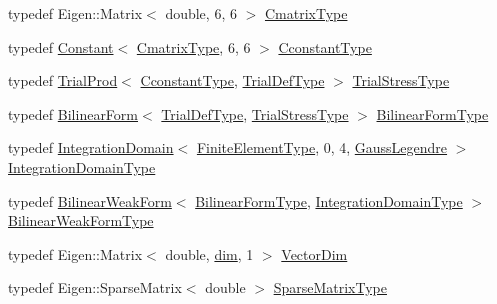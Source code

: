 \begin{DoxyCompactItemize}
\item 
typedef Eigen\+::\+Matrix$<$ double, 6, 6 $>$ \hyperlink{classmodel_1_1_b_v_psolver_a5c38d43773f72a099a19d5e4663e9c20}{Cmatrix\+Type}
\item 
typedef \hyperlink{structmodel_1_1_constant}{Constant}$<$ \hyperlink{classmodel_1_1_b_v_psolver_a5c38d43773f72a099a19d5e4663e9c20}{Cmatrix\+Type}, 6, 6 $>$ \hyperlink{classmodel_1_1_b_v_psolver_ab9bcff4d15a79d2622265feb7e755aa6}{Cconstant\+Type}
\item 
typedef \hyperlink{classmodel_1_1_trial_prod}{Trial\+Prod}$<$ \hyperlink{classmodel_1_1_b_v_psolver_ab9bcff4d15a79d2622265feb7e755aa6}{Cconstant\+Type}, \hyperlink{classmodel_1_1_b_v_psolver_aa514066cc07fb36e5f66dcc384b81309}{Trial\+Def\+Type} $>$ \hyperlink{classmodel_1_1_b_v_psolver_a6bc66eb0f47862bcb00b530cf9b85601}{Trial\+Stress\+Type}
\item 
typedef \hyperlink{structmodel_1_1_bilinear_form}{Bilinear\+Form}$<$ \hyperlink{classmodel_1_1_b_v_psolver_aa514066cc07fb36e5f66dcc384b81309}{Trial\+Def\+Type}, \hyperlink{classmodel_1_1_b_v_psolver_a6bc66eb0f47862bcb00b530cf9b85601}{Trial\+Stress\+Type} $>$ \hyperlink{classmodel_1_1_b_v_psolver_abf2cbb433fe3755ad102b97e8c0e5797}{Bilinear\+Form\+Type}
\item 
typedef \hyperlink{structmodel_1_1_integration_domain}{Integration\+Domain}$<$ \hyperlink{classmodel_1_1_b_v_psolver_a010425e48ff247a2d8203f4625b29ea1}{Finite\+Element\+Type}, 0, 4, \hyperlink{structmodel_1_1_gauss_legendre}{Gauss\+Legendre} $>$ \hyperlink{classmodel_1_1_b_v_psolver_af03861ac7fe7224f64e5b900e784326c}{Integration\+Domain\+Type}
\item 
typedef \hyperlink{structmodel_1_1_bilinear_weak_form}{Bilinear\+Weak\+Form}$<$ \hyperlink{classmodel_1_1_b_v_psolver_abf2cbb433fe3755ad102b97e8c0e5797}{Bilinear\+Form\+Type}, \hyperlink{classmodel_1_1_b_v_psolver_af03861ac7fe7224f64e5b900e784326c}{Integration\+Domain\+Type} $>$ \hyperlink{classmodel_1_1_b_v_psolver_a06f36ccb87e0ec560ed0f8820527e8a5}{Bilinear\+Weak\+Form\+Type}
\item 
typedef Eigen\+::\+Matrix$<$ double, \hyperlink{plot_nd_a_8m_a382f3ca768b275b8d563604f7fc7df73}{dim}, 1 $>$ \hyperlink{classmodel_1_1_b_v_psolver_a5fb720fa6675fefac0f86f15a5104562}{Vector\+Dim}
\item 
typedef Eigen\+::\+Sparse\+Matrix$<$ double $>$ \hyperlink{classmodel_1_1_b_v_psolver_aa1a436138f81997a837ad1996ecf5eaf}{Sparse\+Matrix\+Type}
\end{DoxyCompactItemize}
